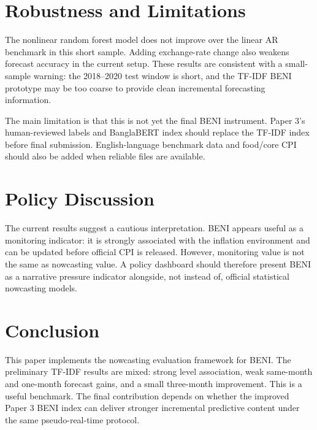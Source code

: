 \documentclass[11pt]{article}
\begin{document}
\section{Robustness and Limitations}

The nonlinear random forest model does not improve over the linear AR benchmark in this short sample. Adding exchange-rate change also weakens forecast accuracy in the current setup. These results are consistent with a small-sample warning: the 2018--2020 test window is short, and the TF-IDF BENI prototype may be too coarse to provide clean incremental forecasting information.

The main limitation is that this is not yet the final BENI instrument. Paper 3's human-reviewed labels and BanglaBERT index should replace the TF-IDF index before final submission. English-language benchmark data and food/core CPI should also be added when reliable files are available.

\section{Policy Discussion}

The current results suggest a cautious interpretation. BENI appears useful as a monitoring indicator: it is strongly associated with the inflation environment and can be updated before official CPI is released. However, monitoring value is not the same as nowcasting value. A policy dashboard should therefore present BENI as a narrative pressure indicator alongside, not instead of, official statistical nowcasting models.

\section{Conclusion}

This paper implements the nowcasting evaluation framework for BENI. The preliminary TF-IDF results are mixed: strong level association, weak same-month and one-month forecast gains, and a small three-month improvement. This is a useful benchmark. The final contribution depends on whether the improved Paper 3 BENI index can deliver stronger incremental predictive content under the same pseudo-real-time protocol.
\end{document}
